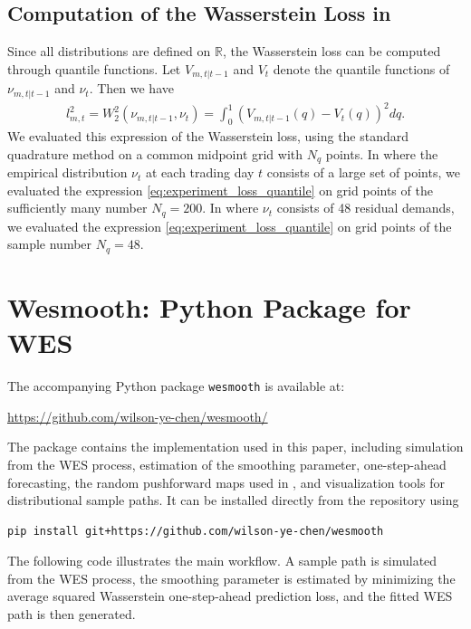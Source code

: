 \documentclass[a4paper, 11pt]{article}
\theoremstyle{definition}
\begin{document}
\subsection{Computation of the Wasserstein Loss in } \label{apx:loss_computation}

Since all distributions are defined on $\mathbb{R}$, the Wasserstein loss can be computed through quantile functions. 
Let $V_{m,t|t-1}$ and $V_t$ denote the quantile functions of $\nu_{m,t|t-1}$ and $\nu_t$. 
Then we have
\begin{align}
    l_{m,t}^2 = W_2^2\left(\nu_{m,t|t-1},\nu_t\right) = \int_0^1 \left( V_{m,t|t-1}(q)-V_t(q) \right)^2 dq . \label{eq:experiment_loss_quantile}
\end{align}
We evaluated this expression of the Wasserstein loss, using the standard quadrature method on a common midpoint grid with $N_q$ points.
In  where the empirical distribution $\nu_t$ at each trading day $t$ consists of a large set of points, we evaluated the expression \eqref{eq:experiment_loss_quantile} on grid points of the sufficiently many number $N_q=200$. 
In  where $\nu_t$ consists of 48 residual demands, we evaluated the expression \eqref{eq:experiment_loss_quantile} on grid points of the sample number $N_q=48$.


\section{Wesmooth: Python Package for WES} \label{appendix:software}

The accompanying Python package \texttt{wesmooth} is available at:
\begin{center}
\url{https://github.com/wilson-ye-chen/wesmooth/}
\end{center}
The package contains the implementation used in this paper, including simulation from the WES process, estimation of the smoothing parameter, one-step-ahead forecasting, the random pushforward maps used in , and visualization tools for distributional sample paths. 
It can be installed directly from the repository using
\begin{mdframed}
\begin{lstlisting}
pip install git+https://github.com/wilson-ye-chen/wesmooth
\end{lstlisting}
\end{mdframed}

The following code illustrates the main workflow. 
A sample path is simulated from the WES process, the smoothing parameter is estimated by minimizing the average squared Wasserstein one-step-ahead prediction loss, and the fitted WES path is then generated.
\end{document}
